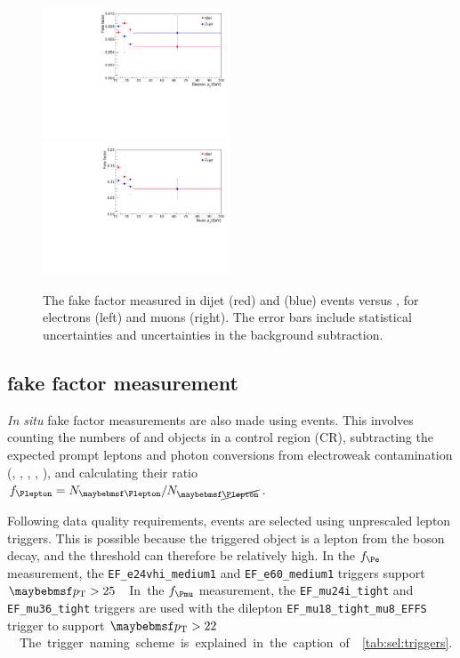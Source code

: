 \begin{figure}
	\includegraphics[width=0.495\textwidth]{custom_images/wjets/ff_el_data}
	\hfill
	\includegraphics[width=0.495\textwidth]{custom_images/wjets/ff_mu_data}
	\caption{The fake factor measured in dijet (red) and \Zjets (blue) events versus \pt, 
	for electrons (left) and muons (right). The error bars include statistical 
	uncertainties and uncertainties in the background subtraction.}
	\label{fig:wjets:ff_data}
\end{figure}



\subsection{\Zjets fake factor measurement}
\label{sec:wjets:zjet_ff}

\textit{In situ} fake factor measurements are also made using \Zjets events. This 
involves counting the numbers of \id{\Plepton} and \antiid{\Plepton} objects in a \Zjets 
control region (CR), subtracting the expected prompt leptons and photon conversions from 
electroweak contamination (\Zgamma, \ZZ, \Zgstar, \WZ, \Wgstar), and calculating their 
ratio $f_{\Plepton} = N_{\id{\Plepton}} / N_{\antiid{\Plepton}}$.

Following data quality requirements, events are selected using unprescaled lepton 
triggers. This is possible because the triggered object is a lepton from the \PZ boson 
decay, and the \pt threshold can therefore be relatively high. In the $f_{\Pe}$ 
measurement, the \verb|EF_e24vhi_medium1| and \verb|EF_e60_medium1| triggers support 
\unit{$\pt > 25$}{\GeV}. In the $f_{\Pmu}$ measurement, the \verb|EF_mu24i_tight| and 
\verb|EF_mu36_tight| triggers are used with the dilepton \verb|EF_mu18_tight_mu8_EFFS| 
trigger to support \unit{$\pt > 22$}{\GeV}. The trigger naming scheme is explained in the 
caption of \Table~\ref{tab:sel:triggers}.

